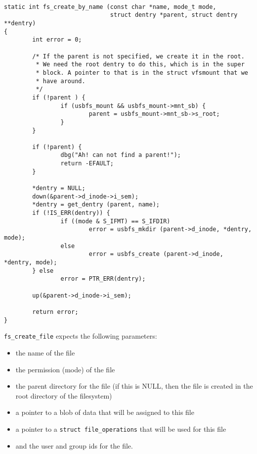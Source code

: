\documentclass[twocolumn]{article}
\begin{document}
\begin{figure*}[tb]
{\tt \small
\begin{verbatim}
static int fs_create_by_name (const char *name, mode_t mode,
                              struct dentry *parent, struct dentry **dentry)
{
        int error = 0;

        /* If the parent is not specified, we create it in the root.
         * We need the root dentry to do this, which is in the super 
         * block. A pointer to that is in the struct vfsmount that we
         * have around.
         */
        if (!parent ) {
                if (usbfs_mount && usbfs_mount->mnt_sb) {
                        parent = usbfs_mount->mnt_sb->s_root;
                }
        }

        if (!parent) {
                dbg("Ah! can not find a parent!");
                return -EFAULT;
        }

        *dentry = NULL;
        down(&parent->d_inode->i_sem);
        *dentry = get_dentry (parent, name);
        if (!IS_ERR(dentry)) {
                if ((mode & S_IFMT) == S_IFDIR)
                        error = usbfs_mkdir (parent->d_inode, *dentry, mode);
                else
                        error = usbfs_create (parent->d_inode, *dentry, mode);
        } else
                error = PTR_ERR(dentry);

        up(&parent->d_inode->i_sem);

        return error;
}
\end{verbatim}
}
\caption{\footnotesize{
{\tt fs\_create\_by\_name} from {\tt drivers/usb/core/inode.c}}}
\label{figure:fs_create_by_name}
\end{figure*}

{\tt fs\_create\_file} expects the following parameters:
\begin{itemize}
\item the name of the file
\item the permission (mode) of the file
\item the parent directory for the file (if this is NULL, then the file is
created in the root directory of the filesystem)
\item a pointer to a blob of data that will be assigned to this file
\item a pointer to a {\tt struct file\_operations} that will be used for
this file
\item and the user and group ids for the file.
\end{itemize}
\end{document}
